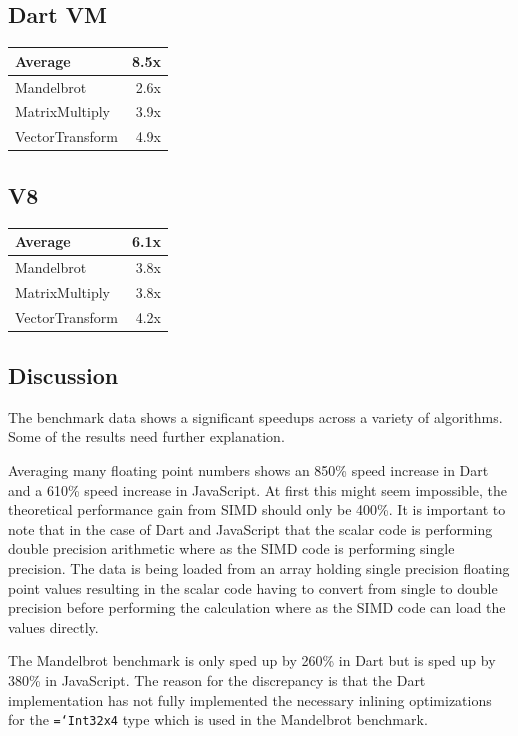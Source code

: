 \documentclass[preprint]{sigplanconf}
\newcommand{\ttt}[1]{{\texttt{\hyphenchar\font=`\-\relax #1}}}%
\begin{document}
\subsection{Dart VM}
\begin{tabular}{|l|r|}
\hline
 Average & 8.5x \\
 \hline
 Mandelbrot & 2.6x \\
 \hline
 MatrixMultiply & 3.9x \\
 \hline
 VectorTransform & 4.9x \\
 \hline
\end{tabular}

\subsection{V8}
\begin{tabular}{|l|r|}
\hline
 Average & 6.1x \\
 \hline
 Mandelbrot & 3.8x \\
 \hline
 MatrixMultiply & 3.8x \\
 \hline
 VectorTransform & 4.2x \\
 \hline
\end{tabular}

\subsection{Discussion}

The benchmark data shows a significant speedups across a variety of algorithms.
Some of the results need further explanation.

Averaging many floating point numbers shows an 850\% speed increase in Dart and
a 610\% speed increase in JavaScript. At first this might seem impossible, the
theoretical performance gain from SIMD should only be 400\%. It is important to
note that in the case of Dart and JavaScript that the scalar code is performing
double precision arithmetic where as the SIMD code is performing single
precision. The data is being loaded from an array holding single precision
floating point values resulting in the scalar code having to convert from single
to double precision before performing the calculation where as the SIMD code can
load the values directly.

The Mandelbrot benchmark is only sped up by 260\% in Dart but is sped up by
380\% in JavaScript. The reason for the discrepancy is that the Dart
implementation has not fully implemented the necessary inlining optimizations
for the \ttt{Int32x4} type which is used in the Mandelbrot benchmark.
\end{document}
